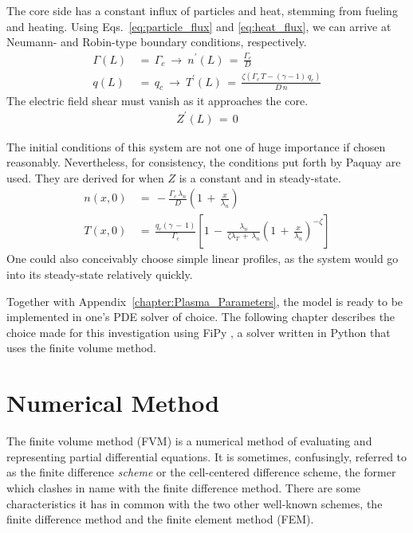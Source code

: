 The core side has a constant influx of particles and heat, stemming from fueling and heating.
Using Eqs.~\ref{eq:particle_flux} and \ref{eq:heat_flux}, we can arrive at Neumann- and Robin-type boundary conditions, respectively.
\begin{align} %
	\Gamma(L) \,&=\, \Gamma_c ~\longrightarrow~ n^\prime(L)
		\,=\, \frac{\Gamma_c}{D} \label{eq:core_particle_flux}\\
	q(L) \,&=\, q_c ~\longrightarrow~ T^\prime(L) \,=\, \frac{\zeta(
		\Gamma_c \, T - (\gamma - 1)\,q_c)}{D \, n} \label{eq:core_heat_flux}
\end{align}
The electric field shear must vanish as it approaches the core.
\begin{align} %
	Z^\prime(L) \,=\, 0 \label{eq:core_Z_boundary}
\end{align}

The initial conditions of this system are not one of huge importance if chosen reasonably.
Nevertheless, for consistency, the conditions put forth by Paquay \cite{paquay_studying_2012} are used.
They are derived for when $Z$ is a constant and in steady-state.
\begin{align} %
	n(x,0) \,&=\, -\frac{\Gamma_c \, \lambda_n}{D} \left(1 \,+\,
		\frac{x}{\lambda_n}\right) \label{eq:n_initial} \\
	T(x,0) \,&=\, \frac{q_c (\gamma \,-\, 1)}{\Gamma_c} \left[1 \,-\,
		\frac{\lambda_n}{\zeta\lambda_T \,+\, \lambda_n} \left(1 \,+\,
		\frac{x}{\lambda_n}\right)^{-\zeta}\right] \label{eq:T_initial}
\end{align}
One could also conceivably choose simple linear profiles, as the system would go into its steady-state relatively quickly.

Together with Appendix~\ref{chapter:Plasma_Parameters}, the model is ready to be implemented in one's PDE solver of choice.
The following chapter describes the choice made for this investigation using FiPy \cite{guyer_fipy:_2009}, a solver written in Python  that uses the finite volume method.

\section{Numerical Method}\label{sec:numerical_method}
The finite volume method (FVM) is a numerical method of evaluating and representing partial differential equations.
It is sometimes, confusingly, referred to as the finite difference \emph{scheme} or the cell-centered difference scheme, the former which clashes in name with the finite difference method.
There are some characteristics it has in common with the two other well-known schemes, the finite difference method and the finite element method (FEM).

